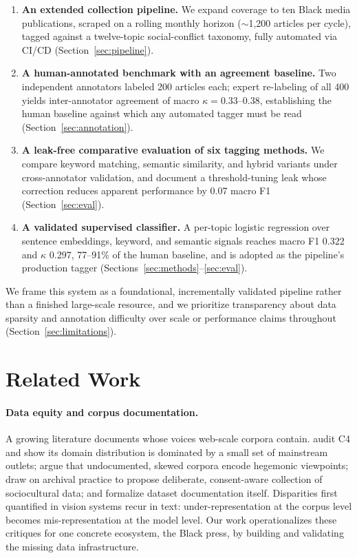 \documentclass[letterpaper]{article}
\begin{document}
\begin{enumerate}
\item \textbf{An extended collection pipeline.} We expand coverage to ten
Black media publications, scraped on a rolling monthly horizon
($\sim$1{,}200 articles per cycle), tagged against a twelve-topic
social-conflict taxonomy, fully automated via CI/CD
(Section~\ref{sec:pipeline}).
\item \textbf{A human-annotated benchmark with an agreement baseline.} Two
independent annotators labeled 200 articles each; expert re-labeling of
all 400 yields inter-annotator agreement of macro $\kappa = 0.33$--$0.38$,
establishing the human baseline against which any automated tagger must
be read (Section~\ref{sec:annotation}).
\item \textbf{A leak-free comparative evaluation of six tagging methods.}
We compare keyword matching, semantic similarity, and hybrid variants
under cross-annotator validation, and document a threshold-tuning leak
whose correction reduces apparent performance by 0.07 macro F1
(Section~\ref{sec:eval}).
\item \textbf{A validated supervised classifier.} A per-topic logistic
regression over sentence embeddings, keyword, and semantic signals
reaches macro F1 0.322 and $\kappa$ 0.297, 77--91\% of the human baseline,
and is adopted as the pipeline's production tagger
(Sections~\ref{sec:methods}--\ref{sec:eval}).
\end{enumerate}

We frame this system as a foundational, incrementally validated pipeline
rather than a finished large-scale resource, and we prioritize
transparency about data sparsity and annotation difficulty over scale or
performance claims throughout (Section~\ref{sec:limitations}).

\section{Related Work}

\paragraph{Data equity and corpus documentation.}
A growing literature documents whose voices web-scale corpora contain.
\citet{dodge2021} audit C4 and show its domain distribution is dominated
by a small set of mainstream outlets; \citet{bender2021} argue that
undocumented, skewed corpora encode hegemonic viewpoints;
\citet{jo2020} draw on archival practice to propose deliberate,
consent-aware collection of sociocultural data; and \citet{gebru2021}
formalize dataset documentation itself. Disparities first quantified in
vision systems \citep{buolamwini2018} recur in text: under-representation
at the corpus level becomes mis-representation at the model level. Our
work operationalizes these critiques for one concrete ecosystem, the
Black press, by building and validating the missing data infrastructure.
\end{document}
